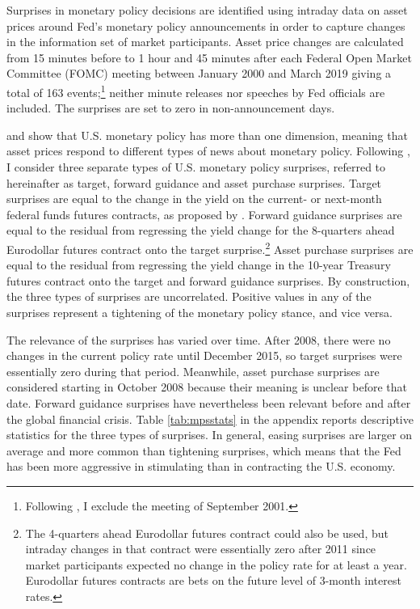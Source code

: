 {Surprises in monetary policy decisions are identified using intraday data on asset prices around Fed's monetary policy announcements in order to capture changes in the information set of market participants. 
Asset price changes are calculated from 15 minutes before to 1 hour and 45 minutes after each Federal Open Market Committee (FOMC) meeting between January 2000 and March 2019 giving a total of 163 events;\footnote{ Following \cite{GSS:2005a}, I exclude the meeting of September 2001.} neither minute releases nor speeches by Fed officials are included. 
The surprises are set to zero in non-announcement days. 

\cite{GSS:2005a} and \cite{Swanson:2021} show that U.S. monetary policy has more than one dimension, meaning that asset prices respond to different types of news about monetary policy. 
Following \cite{RogersScottiWright:2018}, I consider three separate types of U.S. monetary policy surprises, referred to hereinafter as target, forward guidance and asset purchase surprises. 
Target surprises are equal to the change in the yield on the current- or next-month federal funds futures contracts, as proposed by \cite{Kuttner:2001}. 
Forward guidance surprises are equal to the residual from regressing the yield change for the 8-quarters ahead Eurodollar futures contract onto the target surprise.\footnote{ The 4-quarters ahead Eurodollar futures contract could also be used, but intraday changes in that contract were essentially zero after 2011 since market participants expected no change in the policy rate for at least a year. Eurodollar futures contracts are bets on the future level of 3-month interest rates.} 
Asset purchase surprises are equal to the residual from regressing the yield change in the 10-year Treasury futures contract onto the target and forward guidance surprises. 
By construction, the three types of surprises are uncorrelated. 
Positive values in any of the surprises represent a tightening of the monetary policy stance, and vice versa.

The relevance of the surprises has varied over time. 
After 2008, there were no changes in the current policy rate until December 2015, so target surprises were essentially zero during that period. 
Meanwhile, asset purchase surprises are considered starting in October 2008 because their meaning is unclear before that date. 
Forward guidance surprises have nevertheless been relevant before and after the global financial crisis. 
Table \ref{tab:mpsstats} in the appendix reports descriptive statistics for the three types of surprises. 
In general, easing surprises are larger on average and more common than tightening surprises, which means that the Fed has been more aggressive in stimulating than in contracting the U.S. economy.


}
